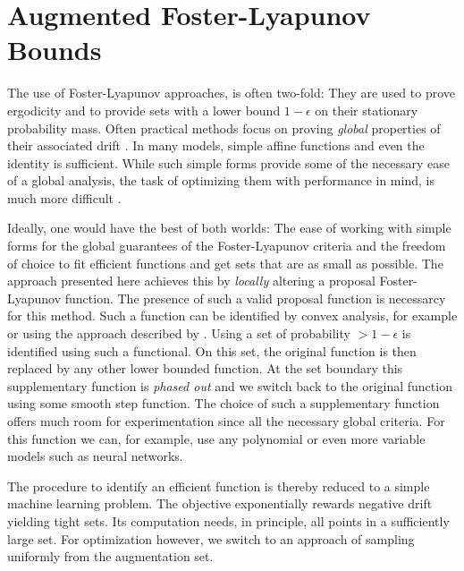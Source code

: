 \section{Augmented Foster-Lyapunov Bounds}\label{ch:lyapunov}
The use of Foster-Lyapunov approaches, is often two-fold: They are used to prove ergodicity and to provide sets with a lower bound $1-\epsilon$ on their stationary probability mass.
Often practical methods focus on proving \emph{global} properties of their associated drift \parencite{gupta2014scalable,spieler2014numerical}.
In many models, simple affine functions \parencite{gupta2017finite} and even the identity \parencite{spieler2014numerical} is sufficient.
While such simple forms provide some of the necessary ease of a global analysis, the task of optimizing them with performance in mind, is much more difficult \parencite{milias2014optimization}.

Ideally, one would have the best of both worlds: The ease of working with simple forms for the global guarantees of the Foster-Lyapunov criteria and the freedom of choice to fit efficient functions and get sets that are as small as possible.
The approach presented here achieves this by \emph{locally} altering a proposal Foster-Lyapunov function.
The presence of such a valid proposal function is necessarcy for this method.
Such a function can be identified by convex analysis, for example \parencite{gupta2014scalable} or using the approach described by \textcite{spieler2014numerical}.
Using a set of probability $>1-\epsilon$ is identified using such a functional.
On this set, the original function is then replaced by any other lower bounded function.
At the set boundary this supplementary function is \emph{phased out} and we switch back to the original function using some smooth step function.
The choice of such a supplementary function offers much room for experimentation since all the necessary global criteria.
For this function we can, for example, use any polynomial or even more variable models such as neural networks.

The procedure to identify an efficient function is thereby reduced to a simple machine learning problem.
The objective exponentially rewards negative drift yielding tight sets.
Its computation needs, in principle, all points in a sufficiently large set.
For optimization however, we switch to an approach of sampling uniformly from the augmentation set.

